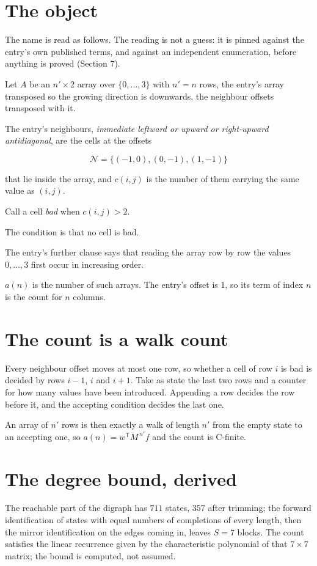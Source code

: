 \documentclass[11pt]{article}
\theoremstyle{definition}
\begin{document}
\section{The object}

The name is read as follows. The reading is not a guess: it is pinned against the entry's own published terms, and against an independent enumeration, before anything is proved (Section 7).

Let $A$ be an $n' \times 2$ array over $\{0,\dots,3\}$ with $n' = n$ rows, the entry's array transposed so the growing direction is downwards, the neighbour offsets transposed with it.

The entry's neighbours, {\itshape immediate leftward or upward or right-upward antidiagonal}, are the cells at the offsets

\[\mathcal{N} = \{(-1,0), (0,-1), (1,-1)\}\]

that lie inside the array, and $c(i,j)$ is the number of them carrying the same value as $(i,j)$.

Call a cell {\itshape bad} when $c(i,j) > 2$.

The condition is that no cell is bad.

The entry's further clause says that reading the array row by row the values $0,\dots,3$ first occur in increasing order.

$a(n)$ is the number of such arrays. The entry's offset is 1, so its term of index $n$ is the count for $n$ columns.

\section{The count is a walk count}

Every neighbour offset moves at most one row, so whether a cell of row $i$ is bad is decided by rows $i-1$, $i$ and $i+1$. Take as state the last two rows and a counter for how many values have been introduced. Appending a row decides the row before it, and the accepting condition decides the last one.

An array of $n'$ rows is then exactly a walk of length $n'$ from the empty state to an accepting one, so $a(n) = w^{\mathsf T}M^{\,n'}f$ and the count is C-finite.

\section{The degree bound, derived}

The reachable part of the digraph has $711$ states, $357$ after trimming; the forward identification of states with equal numbers of completions of every length, then the mirror identification on the edges coming in, leaves $S = 7$ blocks. The count satisfies the linear recurrence given by the characteristic polynomial of that $7\times7$ matrix; the bound is computed, not assumed.
\end{document}
